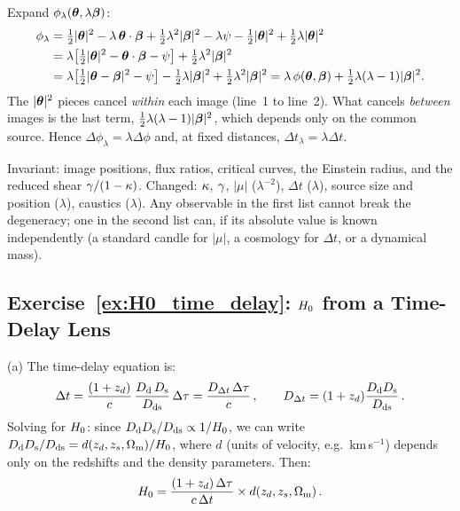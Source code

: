 \begin{derivation}
Expand $\phi_\lambda(\boldsymbol{\theta},\lambda\boldsymbol{\beta})$:
\begin{align*}
  \phi_\lambda
  &= \tfrac12|\boldsymbol{\theta}|^2 - \lambda\,\boldsymbol{\theta}\cdot\boldsymbol{\beta} + \tfrac12\lambda^2|\boldsymbol{\beta}|^2
     - \lambda\psi - \tfrac12|\boldsymbol{\theta}|^2 + \tfrac12\lambda|\boldsymbol{\theta}|^2\\
  &= \lambda\big[\tfrac12|\boldsymbol{\theta}|^2 - \boldsymbol{\theta}\cdot\boldsymbol{\beta} - \psi\big] + \tfrac12\lambda^2|\boldsymbol{\beta}|^2\\
  &= \lambda\big[\tfrac12|\boldsymbol{\theta}-\boldsymbol{\beta}|^2 - \psi\big] - \tfrac12\lambda|\boldsymbol{\beta}|^2 + \tfrac12\lambda^2|\boldsymbol{\beta}|^2
   = \lambda\,\phi(\boldsymbol{\theta},\boldsymbol{\beta}) + \tfrac12\lambda(\lambda-1)|\boldsymbol{\beta}|^2 .
\end{align*}
The $|\boldsymbol{\theta}|^2$ pieces cancel \emph{within} each image (line~1 to
line~2).  What cancels \emph{between} images is the last term,
$\tfrac12\lambda(\lambda-1)|\boldsymbol{\beta}|^2$, which depends only on the common
source.  Hence $\Delta\phi_\lambda = \lambda\Delta\phi$ and, at fixed
distances, $\Delta t_\lambda = \lambda\Delta t$.
\end{derivation}

\begin{annotation}
Invariant: image positions, flux ratios, critical curves, the Einstein radius,
and the reduced shear $\gamma/(1-\kappa)$.  Changed: $\kappa$, $\gamma$,
$|\mu|$ ($\lambda^{-2}$), $\Delta t$ ($\lambda$), source size and position
($\lambda$), caustics ($\lambda$).  Any observable in the first list cannot
break the degeneracy; one in the second list can, if its absolute value is
known independently (a standard candle for $|\mu|$, a cosmology for
$\Delta t$, or a dynamical mass).
\end{annotation}


\subsection*{Exercise~\ref{ex:H0_time_delay}: $H_0$ from a Time-Delay Lens}

(a) The time-delay equation is:
\begin{equation*}
    \Delta t = \frac{(1+z_d)}{c}
    \,\frac{D_{\mathrm{d}}\,D_{\mathrm{s}}}{D_{\mathrm{ds}}}\,\Delta\tau
    = \frac{D_{\Delta t}\,\Delta\tau}{c}\,,
    \qquad D_{\Delta t} = (1+z_d)\frac{D_{\mathrm{d}}D_{\mathrm{s}}}{D_{\mathrm{ds}}}\,.
\end{equation*}
Solving for $H_0$: since $D_{\mathrm{d}}D_{\mathrm{s}}/D_{\mathrm{ds}} \propto 1/H_0$,
we can write
$D_{\mathrm{d}}D_{\mathrm{s}}/D_{\mathrm{ds}} = d(z_d, z_s, \Omega_{\mathrm{m}})/H_0$, where $d$ (units of
velocity, e.g.\ km\,s$^{-1}$) depends only on the redshifts and the
density parameters.
Then:
\begin{equation*}
    H_0 = \frac{(1+z_d)\,\Delta\tau}{c\,\Delta t}
    \times d(z_d, z_s, \Omega_{\mathrm{m}}) \,.
\end{equation*}

